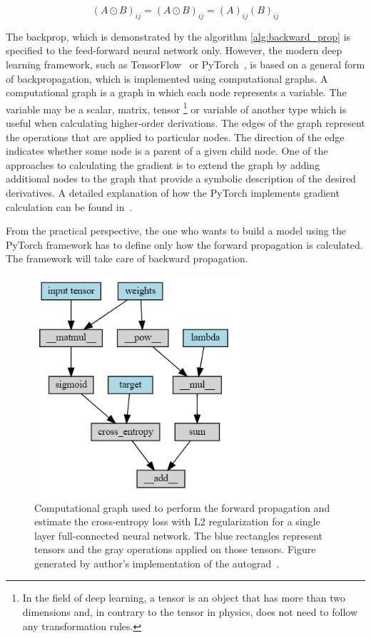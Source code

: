\begin{equation}
    (A \odot B)_{ij} = (A \odot B)_{ij} = (A)_{ij} (B)_{ij}
\end{equation}

The backprop, which is demonstrated by the algorithm \ref{alg:backward_prop} is specified to the feed-forward neural network only. However, the modern deep learning framework, such as TensorFlow~\cite{tensorflow} or PyTorch~\cite{pytorch}, is based on a general form of backpropagation, which is implemented using computational graphs. 
A computational graph is a graph in which each node represents a variable. The variable may be a scalar, matrix,  tensor \footnote{In the field of deep learning, a tensor is an object that has more than two dimensions and, in contrary to the tensor in physics, does not need to follow any transformation rules.} or variable of another type which is useful when calculating higher-order derivations.    
The edges of the graph represent the operations that are applied to particular nodes. The direction of the edge indicates whether some node is a parent of a given child node. 
One of the approaches to calculating the gradient is to extend the graph by adding additional nodes to the graph that provide a symbolic description of the desired derivatives. A detailed explanation of how the PyTorch implements gradient calculation can be found in~\cite{autograd}. 

From the practical perspective, the one who wants to build a model using the PyTorch framework has to define only how the forward propagation is calculated. The framework will take care of backward propagation.

\begin{figure}[!ht]
\centering
\includegraphics[width=0.7\textwidth]{figures/Comput_graph_2.PNG}
\caption{Computational graph used to perform the forward propagation and estimate the cross-entropy loss with L2 regularization for a single layer full-connected neural network. The blue rectangles represent tensors and the gray operations applied on those tensors. Figure generated by author's implementation of the autograd~\cite{utorch}.
}
\label{fig:Comput_graph}
\end{figure} 

